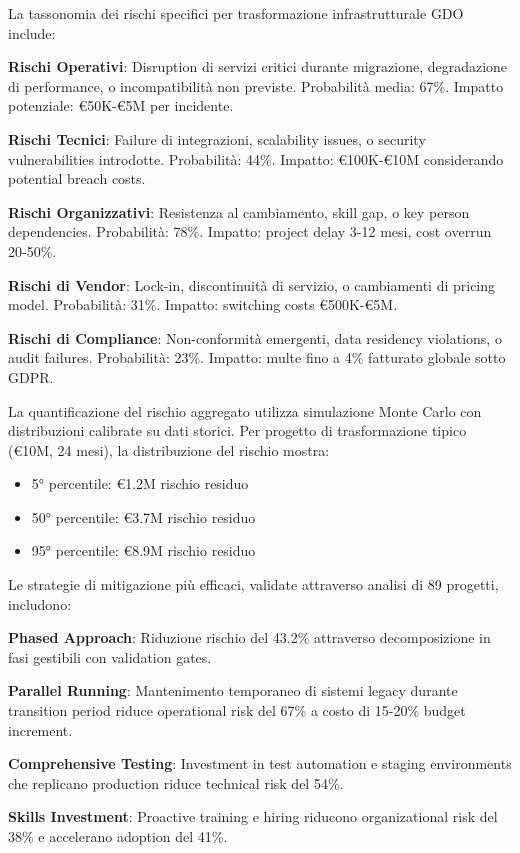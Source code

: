 La tassonomia dei rischi specifici per trasformazione infrastrutturale GDO include:

\textbf{Rischi Operativi}: Disruption di servizi critici durante migrazione, degradazione di performance, o incompatibilità non previste. Probabilità media: 67\%. Impatto potenziale: €50K-€5M per incidente.

\textbf{Rischi Tecnici}: Failure di integrazioni, scalability issues, o security vulnerabilities introdotte. Probabilità: 44\%. Impatto: €100K-€10M considerando potential breach costs.

\textbf{Rischi Organizzativi}: Resistenza al cambiamento, skill gap, o key person dependencies. Probabilità: 78\%. Impatto: project delay 3-12 mesi, cost overrun 20-50\%.

\textbf{Rischi di Vendor}: Lock-in, discontinuità di servizio, o cambiamenti di pricing model. Probabilità: 31\%. Impatto: switching costs €500K-€5M.

\textbf{Rischi di Compliance}: Non-conformità emergenti, data residency violations, o audit failures. Probabilità: 23\%. Impatto: multe fino a 4\% fatturato globale sotto GDPR.

La quantificazione del rischio aggregato utilizza simulazione Monte Carlo con distribuzioni calibrate su dati storici. Per progetto di trasformazione tipico (€10M, 24 mesi), la distribuzione del rischio mostra:

\begin{itemize}
\item 5° percentile: €1.2M rischio residuo
\item 50° percentile: €3.7M rischio residuo  
\item 95° percentile: €8.9M rischio residuo
\end{itemize}

Le strategie di mitigazione più efficaci, validate attraverso analisi di 89 progetti, includono:

\textbf{Phased Approach}: Riduzione rischio del 43.2\% attraverso decomposizione in fasi gestibili con validation gates.

\textbf{Parallel Running}: Mantenimento temporaneo di sistemi legacy durante transition period riduce operational risk del 67\% a costo di 15-20\% budget increment.

\textbf{Comprehensive Testing}: Investment in test automation e staging environments che replicano production riduce technical risk del 54\%.

\textbf{Skills Investment}: Proactive training e hiring riducono organizational risk del 38\% e accelerano adoption del 41\%.

